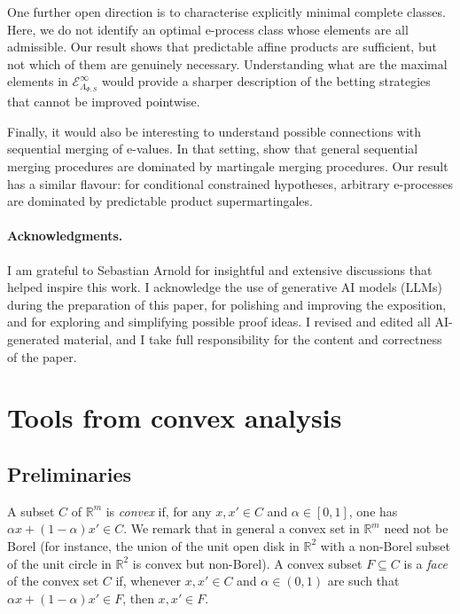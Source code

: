 \documentclass[10pt, a4paper]{article}
\newcommand{\Ee}{\mathcal E}
\newcommand{\R}{\mathbb R}
\begin{document}
One further open direction is to characterise explicitly minimal complete classes. Here, we do not identify an optimal e-process class whose elements are all admissible. Our result shows that predictable affine products are sufficient, but not which of them are genuinely necessary. Understanding what are the maximal elements in $\Ee_{\Lambda_{\Phi,S}}^\infty$ would provide a sharper description of the betting strategies that cannot be improved pointwise.

Finally, it would also be interesting to understand possible connections with sequential merging of e-values. In that setting, \citet{vovk2021merging} show that general sequential merging procedures are dominated by martingale merging procedures. Our result has a similar flavour: for conditional constrained hypotheses, arbitrary e-processes are dominated by predictable product supermartingales. %
\paragraph{Acknowledgments.}
I am grateful to Sebastian Arnold for insightful and extensive discussions that helped inspire this work. I acknowledge the use of generative AI models (LLMs) during the preparation of this paper, for polishing and improving the exposition, and for exploring and simplifying possible proof ideas. I revised and edited all AI-generated material, and I take full responsibility for the content and correctness of the paper.


\newpage

\appendix
{}
\section{Tools from convex analysis}\label{app:convex}
\subsection{Preliminaries}
A subset $C$ of $\R^m$ is \emph{convex} if, for any $x,x'\in C$ and  $\alpha\in[0,1]$, one has $\alpha x + (1-\alpha)x'\in C$. We remark that in general a convex set in $\R^m$ need not be Borel (for instance, the union of the unit open disk in $\R^2$ with a non-Borel subset of the unit circle in $\R^2$ is convex but non-Borel). A convex subset $F\subseteq C$ is a \emph{face} of the convex set $C$ if, whenever $x,x'\in C$ and $\alpha\in(0,1)$ are such that $\alpha x+(1-\alpha)x'\in F$, then $x,x'\in F$. 
\end{document}
